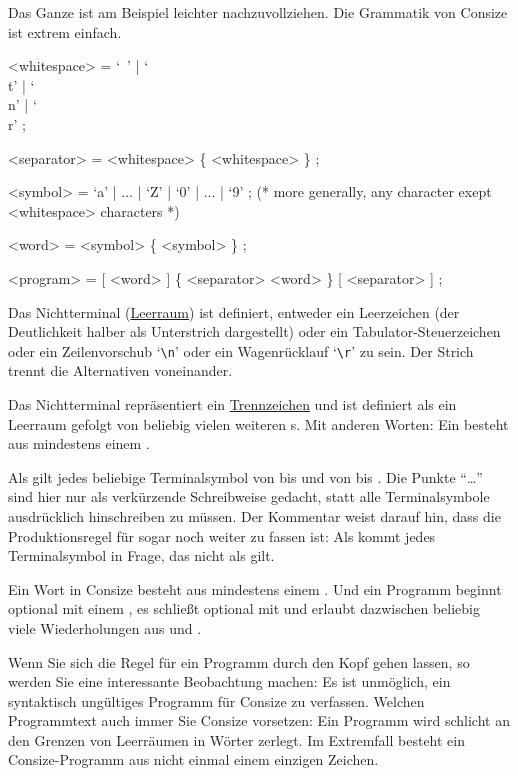 Das Ganze ist am Beispiel leichter nachzuvollziehen. Die Grammatik von Consize ist extrem einfach.

\begin{grammar}
<whitespace> = `\ ' | `\\t' | `\\n' | `\\r' ;

<separator> = <whitespace> \{ <whitespace> \} ;

<symbol> = `a' | ... | `Z' | `0' | ... | `9'  ; (* more generally, any character exept <whitespace> characters *)

<word> = <symbol> \{ <symbol> \} ;

<program> =  [ <word> ] \{ <separator> <word> \} [ <separator> ] ;
\end{grammar}

Das Nichtterminal  (\href{http://de.wikipedia.org/wiki/Leerraum}{Leerraum}) ist definiert, entweder ein Leerzeichen (der Deutlichkeit halber als Unterstrich dargestellt) oder ein Tabulator-Steuerzeichen oder ein Zeilenvorschub `\verb|\n|' oder ein Wagenrücklauf `\verb|\r|' zu sein. Der Strich trennt die Alternativen voneinander.

Das Nichtterminal  repräsentiert ein \href{http://de.wikipedia.org/wiki/Trennzeichen}{Trennzeichen} und ist definiert als ein Leerraum  gefolgt von beliebig vielen weiteren s. Mit anderen Worten: Ein  besteht aus mindestens einem .

Als  gilt jedes beliebige Terminalsymbol von  bis  und von  bis . Die Punkte "`\dots"' sind hier nur als verkürzende Schreibweise gedacht, statt alle Terminalsymbole ausdrücklich hinschreiben zu müssen. Der Kommentar weist darauf hin, dass die Produktionsregel für  sogar noch weiter zu fassen ist: Als  kommt jedes Terminalsymbol in Frage, das nicht als  gilt.

Ein Wort  in Consize besteht aus mindestens einem . Und ein Programm  beginnt optional mit einem , es schließt optional mit  und erlaubt dazwischen beliebig viele Wiederholungen aus  und .

Wenn Sie sich die Regel für ein Programm  durch den Kopf gehen lassen, so werden Sie eine interessante Beobachtung machen: Es ist unmöglich, ein syntaktisch ungültiges Programm für Consize zu verfassen. Welchen Programmtext auch immer Sie Consize vorsetzen: Ein Programm wird schlicht an den Grenzen von Leerräumen in Wörter zerlegt. Im Extremfall besteht ein Consize-Programm aus nicht einmal einem einzigen Zeichen.

